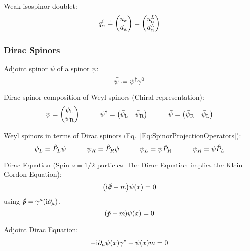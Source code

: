 			\noindent
			Weak isospinor doublet:
			\begin{equation}
				q_{\alpha}^i \doteq \mqty(u_{\alpha} \\ d_{\alpha}) = \mqty(u^L_{\alpha} \\ d^L_{\alpha})
			\end{equation}




		\subsubsection{Dirac Spinors}
			Adjoint spinor $\bar{\psi}$ of a spinor $\psi$:
			\begin{equation}
				\bar{\psi} \defeq \psi^{\dagger} \gamma^0
			\end{equation}

			\noindent
			Dirac spinor composition of Weyl spinors (Chiral representation):
			\begin{equation}
				\psi = \mqty(\psi_\text{L} \\ \psi_\text{R})
				\hsp
				\psi^\dagger = \mqty(\bar{\psi}_\text{L} & \bar{\psi}_\text{R})
				\hsp
				\bar{\psi} = \mqty(\bar{\psi}_\text{R} & \bar{\psi}_\text{L})
			\end{equation}

			\noindent
			Weyl spinors in terms of Dirac spinors (Eq.~\ref{Eq:SpinorProjectionOperators}):
			\begin{equation}
				\psi_L = \hat{P}_L \psi \hspace{30pt} \psi_R = \hat{P}_R \psi
				\hspace{30pt}
				\bar{\psi}_L = \bar{\psi} \hat{P}_R \hspace{30pt} \bar{\psi}_R = \bar{\psi} \hat{P}_L
			\end{equation}

			\noindent
			Dirac Equation (Spin $s=1/2$ particles. The Dirac Equation implies the Klein--Gordon Equation):
			\begin{equation}
				\qty(\mathrm{i}\slashed{\partial} - m ) \psi\qty(x) = 0
			\end{equation}
			using $\slashed{\hat{p}} = \gamma^\mu(\mathrm{i}\partial_\mu)$.
			\begin{equation}
				\qty(\slashed{\hat{p}} - m) \psi\qty(x) = 0
			\end{equation}

			\noindent
			Adjoint Dirac Equation:
			\begin{equation}
				-\mathrm{i} \partial_\mu \bar{\psi}(x)\gamma^\mu-\bar\psi(x)m = 0
			\end{equation}

